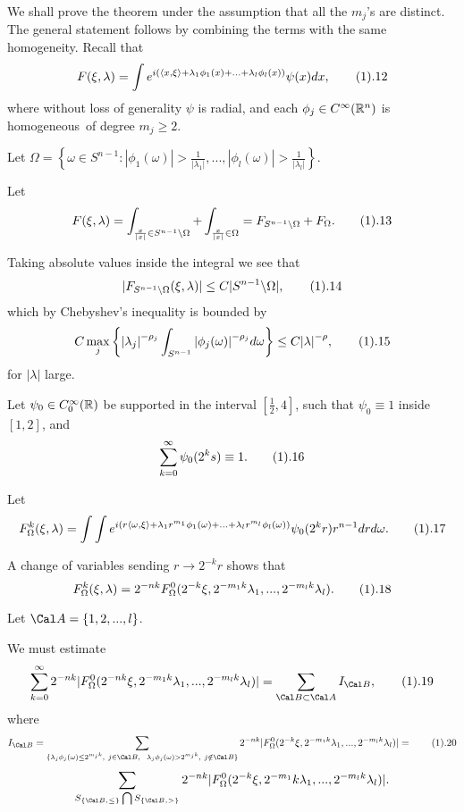  We shall prove the theorem under the assumption 
that all the $m_j$'s are distinct. The general statement follows by combining  
the terms with the same homogeneity. Recall that 
$$ F(\xi,\lambda)=\int e^{i(\langle x,\xi \rangle +{\lambda}_1{\phi}_1(x)+
...+ {\lambda}_l{\phi}_l(x))} \psi(x)dx, \tag1.12$$ 
where without loss of generality 
$\psi$ is radial, and each ${\phi}_j \in C^{\infty}({\Bbb R}^n)$ is homogeneous\
of degree $m_j \ge 2$. 

Let ${\Omega}=\left\{\omega \in S^{n-1}: 
|{\phi}_1(\omega)|>\frac{1}{|{\lambda}_1|},..., 
|{\phi}_l(\omega)|>\frac{1}{|{\lambda}_l|}\right\}$. 

Let 
$$ F(\xi,\lambda)=\int_{\frac{x}{|x|}\in S^{n-1}\backslash {\Omega}} 
+\int_{ \frac{x}{|x|} \in {\Omega}}=
F_{S^{n-1} \backslash {\Omega}}+F_{{\Omega}}.\tag1.13$$ 

Taking absolute values inside the integral we see that 
$$ |F_{S^{n-1}\backslash {\Omega}}(\xi,\lambda)| \leq 
C|S^{n-1}\backslash {\Omega}|, \tag1.14$$ 
which by Chebyshev's inequality is bounded by
$$ C\max_{j} \left\{{|{\lambda}_j|}^{-\rho_j} 
\int_{S^{n-1}} {|{\phi}_j(\omega)|}^{-\rho_j} d\omega \right\}\leq 
C{|\lambda|}^{-\rho},\tag1.15$$ for $|\lambda|$ large. 

Let ${\psi}_0 \in C^{\infty}_{0}({\Bbb R})$ be supported in the interval 
$[\frac{1}{2}, 4]$, such that ${\psi}_0 \equiv 1$ inside $[1,2]$, and 
$$ \sum_{k=0}^{\infty}{\psi}_0(2^ks)\equiv 1. \tag1.16$$ 

Let 
$$ F^k_{\Omega}(\xi,\lambda)=
\int \int e^{i(r\langle \omega, \xi \rangle+ 
{\lambda}_1r^{m_1}{\phi}_1(\omega)+
...+ {\lambda}_lr^{m_l}{\phi}_l(\omega))} 
{\psi}_0(2^kr)r^{n-1}drd\omega.\tag1.17$$ 

A change of variables sending $r \rightarrow 2^{-k}r$ shows that 
$$F^k_{\Omega}(\xi,\lambda)=2^{-nk}
F^{0}_{\Omega}(2^{-k}\xi, 2^{-m_1k}
{\lambda}_1,..., 2^{-m_lk}{\lambda}_l).\tag1.18$$ 

Let ${\Cal A}=\{1,2,..., l\}$. 

We must estimate 
$$ \sum_{k=0}^{\infty}2^{-nk}|F^{0}_{\Omega}(2^{-nk}\xi, 2^{-m_1k}{\lambda}_1, 
..., 2^{-m_lk}{\lambda}_l)|=
\sum_{{\Cal B} \subset {\Cal A}} I_{{\Cal B}}, \tag1.19$$ where
$$ I_{{\Cal B}}=\sum_{\{{\lambda}_j{\phi}_j(\omega)\leq 2^{m_jk}, \ j\in {\Cal B}, 
\ \ {\lambda}_j{\phi}_j(\omega)>2^{m_jk}, \ j \notin {\Cal B}\}} 
2^{-nk}|F^{0}_{\Omega}(2^{-k}\xi, 2^{-m_1k}{\lambda}_1,..., 2^{-m_lk}{\lambda}_l)|
=\tag1.20$$
$$ \sum_{S_{\{{\Cal B},\leq\}}\bigcap S_{\{{\Cal B},>\}}}  
2^{-nk}|F^{0}_{\Omega}(2^{-k}\xi, 2^{-m_1}k{\lambda}_1,
..., 2^{-m_lk}{\lambda}_l)|.$$ 

